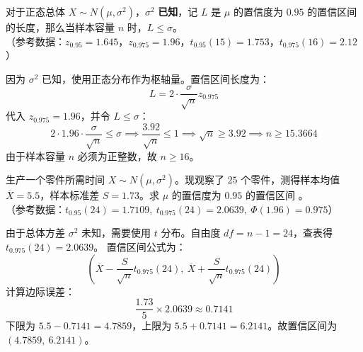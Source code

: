 \documentclass[lang=cn,11pt]{elegantbook}
\begin{document}
\begin{exercise} \label{prob:ci_1}
对于正态总体 $X \sim N(\mu, \sigma^2)$，$\sigma^2$ \textbf{已知}，记 $L$ 是 $\mu$ 的置信度为 $0.95$ 的置信区间的长度，那么当样本容量 $n$ \underline{\qquad\qquad} 时，$L \leq \sigma$。\\
（参考数据：$z_{0.95}=1.645$，$z_{0.975}=1.96$，$t_{0.95}(15)=1.753$，$t_{0.975}(16)=2.12$）
\end{exercise}
\begin{solution}
因为 $\sigma^2$ 已知，使用正态分布作为枢轴量。置信区间长度为：
\begin{equation*}
L = 2 \cdot \frac{\sigma}{\sqrt{n}} z_{0.975}
\end{equation*}
代入 $z_{0.975}=1.96$，并令 $L \leq \sigma$：
\begin{equation*}
2 \cdot 1.96 \cdot \frac{\sigma}{\sqrt{n}} \leq \sigma \implies \frac{3.92}{\sqrt{n}} \leq 1 \implies \sqrt{n} \geq 3.92 \implies n \geq 15.3664
\end{equation*}
由于样本容量 $n$ 必须为正整数，故 $n \ge 16$。
\end{solution}

\begin{exercise} \label{prob:ci_2}
生产一个零件所需时间 $X \sim N(\mu, \sigma^2)$。现观察了 $25$ 个零件，测得样本均值 $\overline{X}=5.5$，样本标准差 $S=1.73$。求 $\mu$ 的置信度为 $0.95$ 的置信区间 \underline{\qquad\qquad}。\\
（参考数据：$t_{0.95}(24)=1.7109,\ t_{0.975}(24)=2.0639,\ \Phi(1.96)=0.975$）
\end{exercise}
\begin{solution}
由于总体方差 $\sigma^2$ 未知，需要使用 $t$ 分布。自由度 $df = n-1 = 24$，查表得 $t_{0.975}(24)=2.0639$。
置信区间公式为：
\begin{equation*}
\left( \overline{X}-\frac{S}{\sqrt{n}}t_{0.975}(24),\ \overline{X}+\frac{S}{\sqrt{n}}t_{0.975}(24) \right)
\end{equation*}
计算边际误差：
\begin{equation*}
\frac{1.73}{5} \times 2.0639 \approx 0.7141
\end{equation*}
下限为 $5.5 - 0.7141 = 4.7859$，上限为 $5.5 + 0.7141 = 6.2141$。故置信区间为 $(4.7859,\ 6.2141)$。
\end{solution}
\end{document}

